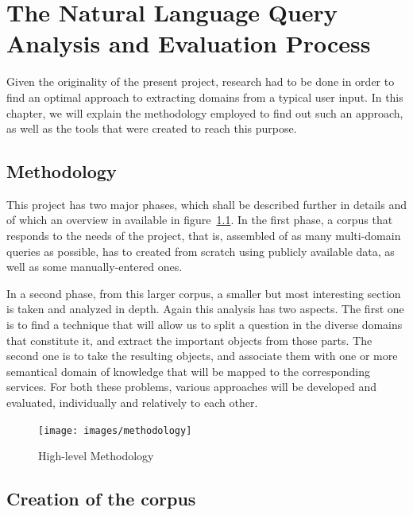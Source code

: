 \chapter{The Natural Language Query Analysis and Evaluation Process} %
\label{cha:specifications}

Given the originality of the present project, research had to be done in order to find an optimal approach to extracting domains from a typical user input. In this chapter, we will explain the methodology employed to find out such an approach, as well as the tools that were created to reach this purpose.

\section{Methodology} %
\label{sec:methodology}

This project has two major phases, which shall be described further in details and of which an overview in available in figure~\ref{fig:methodology}. In the first phase, a corpus that responds to the needs of the project, that is, assembled of as many multi-domain queries as possible, has to created from scratch using publicly available data, as well as some manually-entered ones.

In a second phase, from this larger corpus, a smaller but most interesting section is taken and analyzed in depth. Again this analysis has two aspects. The first one is to find a technique that will allow us to split a question in the diverse domains that constitute it, and extract the important objects from those parts. The second one is to take the resulting objects, and associate them with one or more semantical domain of knowledge that will be mapped to the corresponding services. For both these problems, various approaches will be developed and evaluated, individually and relatively to each other.

\begin{figure}[ht!]
  \begin{center}
    \texttt{[image: images/methodology]}
  \end{center}
  \caption{High-level Methodology}\label{fig:methodology}
\end{figure}


\section{Creation of the corpus} %
\label{sec:creation_of_the_corpus}

